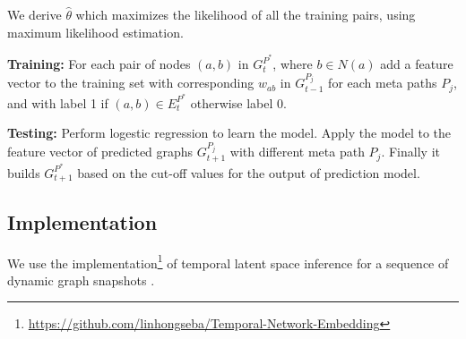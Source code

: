 We derive \textbf{$\hat{\theta}$} which maximizes the likelihood of all the training pairs, using maximum likelihood estimation.


\textbf{Training:} For each pair of nodes $(a,b)$ in $G^{P^*}_{t}$, where $b \in N(a)$ add a feature vector to the training set with corresponding $w_{ab}$ in $G^{P_j}_{t-1}$ for each meta paths $P_j$, and with label 1 if $(a,b) \in E^{P^*}_{t}$ otherwise label 0.

\textbf{Testing:} Perform logestic regression to learn the model. Apply the model to the feature vector of predicted graphs $G^{P_j}_{t+1}$ with different meta path $P_j$. Finally it builds $G^{P^*}_{t+1}$ based on the cut-off values for the output of prediction model.


\subsection{Implementation}

We use the implementation\footnote{\url{https://github.com/linhongseba/Temporal-Network-Embedding}} of temporal latent space inference for a sequence of dynamic graph snapshots \cite{Zhu2016}.









    

    

